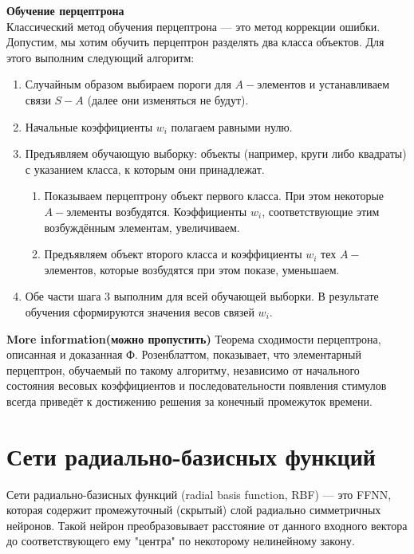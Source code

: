 \documentclass[paper=a4, fontsize=11pt]{scrartcl} %
\numberwithin{equation}{section} %
\numberwithin{figure}{section} %
\numberwithin{table}{section} %
\begin{document}
	\textbf{Обучение перцептрона}\\
	Классический метод обучения перцептрона — это метод коррекции ошибки.\\
	Допустим, мы хотим обучить перцептрон разделять два класса объектов. Для этого выполним следующий алгоритм:
	
	\begin{enumerate}	
		\item Случайным образом выбираем пороги для $A-$элементов и устанавливаем связи $S-A$ (далее они изменяться не будут).
		\item Начальные коэффициенты $w_{i}$ полагаем равными нулю.
		\item Предъявляем обучающую выборку: объекты (например, круги либо квадраты) с указанием класса, к которым они принадлежат.
		\begin{enumerate}	
			\item Показываем перцептрону объект первого класса. При этом некоторые $A-$элементы возбудятся. Коэффициенты $w_{i}$, соответствующие этим возбуждённым элементам, увеличиваем.
			\item Предъявляем объект второго класса и коэффициенты $w_{i}$ тех $A-$элементов, которые возбудятся при этом показе, уменьшаем.
		\end{enumerate}
		\item Обе части шага 3 выполним для всей обучающей выборки. В результате обучения сформируются значения весов связей $w_{i}$.
	\end{enumerate}

	\textbf{More information(можно пропустить)}
	Теорема сходимости перцептрона, описанная и доказанная Ф. Розенблаттом, показывает, что элементарный перцептрон, обучаемый по такому алгоритму, независимо от начального состояния весовых коэффициентов и последовательности появления стимулов всегда приведёт к достижению решения за конечный промежуток времени.

	\section{Сети радиально-базисных функций}
	
	Сети радиально-базисных функций (radial basis function, RBF) — это FFNN, которая содержит промежуточный (скрытый) слой радиально симметричных нейронов. Такой нейрон преобразовывает расстояние от данного входного вектора до соответствующего ему "центра" по некоторому нелинейному закону.
	
\end{document}
